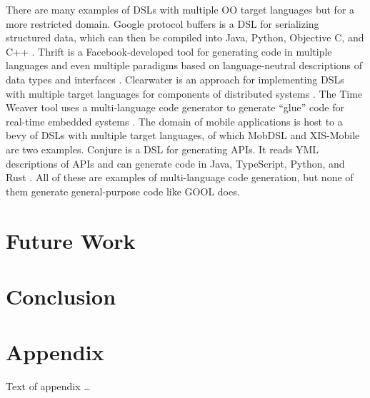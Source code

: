 \documentclass[sigplan,review,anonymous]{acmart}
\begin{document}
There are many examples of DSLs with multiple OO target languages but for a 
more restricted domain. Google protocol buffers is a DSL for serializing 
structured data, which can then be compiled into Java, Python, Objective C, and 
C++ \cite{Protobuf}. Thrift is a Facebook-developed tool for generating code in 
multiple languages and even multiple paradigms based on language-neutral 
descriptions of data types and interfaces \cite{slee2007thrift}. Clearwater is 
an approach for implementing DSLs with multiple target languages for components 
of distributed systems \cite{swint2005clearwater}. The Time Weaver tool uses a 
multi-language code generator to generate ``glue'' code for real-time embedded 
systems \cite{de2004glue}. The domain of mobile 
applications is host to a bevy of DSLs with multiple target languages, of which 
MobDSL \cite{kramer2010mobdsl} and XIS-Mobile \cite{ribeiro2014xis} are two 
examples. Conjure is a DSL for generating APIs. It reads YML descriptions of 
APIs and can generate code in Java, TypeScript, Python, and Rust 
\cite{Conjure}. All of these are examples of multi-language code generation, 
but none of them generate general-purpose code like GOOL does.

\section{Future Work} \label{future}
\section{Conclusion} \label{conclusions}







\appendix
\section{Appendix}

Text of appendix \ldots
\end{document}
